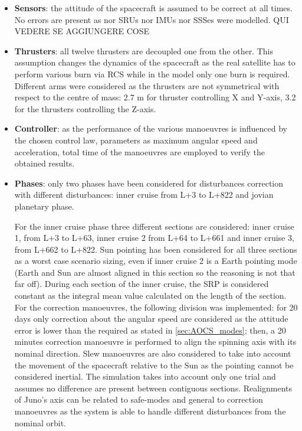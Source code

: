 \begin{itemize}
    \item \textbf{Sensors}: the attitude of the spacecraft is assumed to be correct at all times. No errors are present as nor SRUs nor IMUs nor SSSes were modelled. QUI VEDERE SE AGGIUNGERE COSE
    
    \item \textbf{Thrusters}: all twelve thrusters are decoupled one from the other. This assumption changes the  dynamics of the spacecraft as the real satellite has to perform various burn via RCS while in the model only one burn is required. %
    Different arms were considered as the thrusters are not symmetrical with respect to the centre of mass: 2.7 m for thruster controlling X and Y-axis, 3.2 for the thrusters controlling the Z-axis.

    \item \textbf{Controller}: as the performance of the various manoeuvres is influenced by the chosen control law, parameters as maximum angular speed and acceleration, total time of the manoeuvres are employed to verify the obtained results. 
    
    \item \textbf{Phases}: only two phases have been considered for disturbances correction with different disturbances: inner cruise from L+3 to L+822 and jovian planetary phase. 
    
    For the inner cruise phase three different sections are considered: inner cruise 1, from L+3 to L+63, inner cruise 2 from L+64 to L+661 and inner cruise 3, from L+662 to L+822. Sun pointing has been considered for all three sections as a worst case scenario sizing, even if inner cruise 2 is a Earth pointing mode (Earth and Sun are almost aligned in this section so the reasoning is not that far off). During each section of the inner cruise, the SRP is considered constant as the integral mean value calculated on the length of the section.
     For the correction manoeuvres, the following division was implemented: for 20 days only correction about the angular speed are considered as the attitude error is lower than the required as stated in \autoref{sec:AOCS_modes}; then, a 20 minutes correction manoeuvre is performed to align the spinning axis with its nominal direction. Slew manoeuvres are also considered to take into account the movement of the spacecraft relative to the Sun as the pointing cannot be considered inertial. The simulation takes into account only one trial and assumes no difference are present between contiguous sections. Realignments of Juno's axis can be related to safe-modes and general to correction manoeuvres as the system is able to handle different disturbances from the nominal orbit. 
    

\end{itemize}
